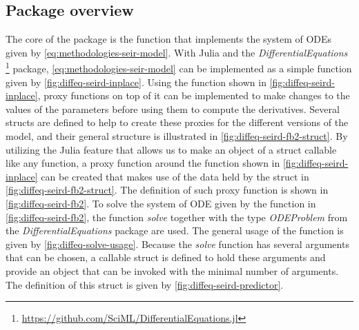 \subsection{Package overview}

The core of the package is the function that implements the system of \glspl{ODE} given by \autoref{eq:methodologies-seir-model}.
With Julia and the \textit{DifferentialEquations} \footnote{\url{https://github.com/SciML/DifferentialEquations.jl}} package, \autoref{eq:methodologies-seir-model} can be implemented as a simple function given by \autoref{fig:diffeq-seird-inplace}.
Using the function shown in \autoref{fig:diffeq-seird-inplace}, proxy functions on top of it can be implemented to make changes to the values of the parameters before using them to compute the derivatives.
Several structs are defined to help to create these proxies for the different versions of the model, and their general structure is illustrated in \autoref{fig:diffeq-seird-fb2-struct}.
By utilizing the Julia feature that allows us to make an object of a struct callable like any function, a proxy function around the function shown in \autoref{fig:diffeq-seird-inplace} can be created that makes use of the data held by the struct in \autoref{fig:diffeq-seird-fb2-struct}.
The definition of such proxy function is shown in \autoref{fig:diffeq-seird-fb2}.
To solve the system of \gls{ODE} given by the function in \autoref{fig:diffeq-seird-fb2}, the function \textit{solve} together with the type \textit{ODEProblem} from the \textit{DifferentialEquations} package are used.
The general usage of the function is given by \autoref{fig:diffeq-solve-usage}.
Because the \textit{solve} function has several arguments that can be chosen, a callable struct is defined to hold these arguments and provide an object that can be invoked with the minimal number of arguments.
The definition of this struct is given by \autoref{fig:diffeq-seird-predictor}.

